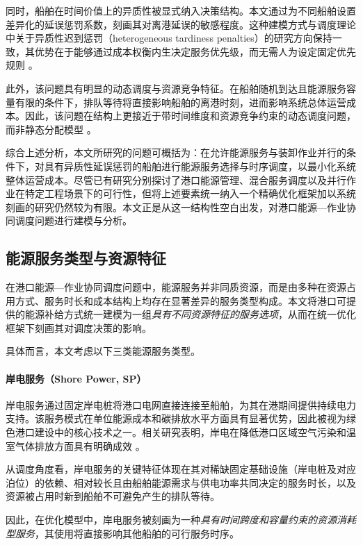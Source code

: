 \documentclass[UTF8, a4paper, 12pt]{ctexart}
\begin{document}
同时，船舶在时间价值上的异质性被显式纳入决策结构。本文通过为不同船舶设置差异化的延误惩罚系数，刻画其对离港延误的敏感程度。这种建模方式与调度理论中关于异质性迟到惩罚（heterogeneous tardiness penalties）的研究方向保持一致，其优势在于能够通过成本权衡内生决定服务优先级，而无需人为设定固定优先规则 \cite{pinedo2016scheduling,vidal2013heuristics}。

此外，该问题具有明显的动态调度与资源竞争特征。在船舶随机到达且能源服务容量有限的条件下，排队等待将直接影响船舶的离港时刻，进而影响系统总体运营成本。因此，该问题在结构上更接近于带时间维度和资源竞争约束的动态调度问题，而非静态分配模型 \cite{brucker2006complexity,Cordeau2015}。

综合上述分析，本文所研究的问题可概括为：在允许能源服务与装卸作业并行的条件下，对具有异质性延误惩罚的船舶进行能源服务选择与时序调度，以最小化系统整体运营成本。尽管已有研究分别探讨了港口能源管理、混合服务调度以及并行作业在特定工程场景下的可行性，但将上述要素统一纳入一个精确优化框架加以系统刻画的研究仍然较为有限。本文正是从这一结构性空白出发，对港口能源—作业协同调度问题进行建模与分析。


\subsection{能源服务类型与资源特征}
\label{sec:energy_service_types}

在港口能源—作业协同调度问题中，能源服务并非同质资源，而是由多种在资源占用方式、服务时长和成本结构上均存在显著差异的服务类型构成。本文将港口可提供的能源补给方式统一建模为一组\emph{具有不同资源特征的服务选项}，从而在统一优化框架下刻画其对调度决策的影响。

具体而言，本文考虑以下三类能源服务类型。

\paragraph{岸电服务（Shore Power, SP）}
岸电服务通过固定岸电桩将港口电网直接连接至船舶，为其在港期间提供持续电力支持。该服务模式在单位能源成本和碳排放水平方面具有显著优势，因此被视为绿色港口建设中的核心技术之一。相关研究表明，岸电在降低港口区域空气污染和温室气体排放方面具有明确成效 \cite{andersson2017shipping,bergqvist2019ports}。

从调度角度看，岸电服务的关键特征体现在其对稀缺固定基础设施（岸电桩及对应泊位）的依赖、相对较长且由船舶能源需求与供电功率共同决定的服务时长，以及资源被占用时新到船舶不可避免产生的排队等待。

因此，在优化模型中，岸电服务被刻画为一种\emph{具有时间跨度和容量约束的资源消耗型服务}，其使用将直接影响其他船舶的可行服务时序。
\end{document}
